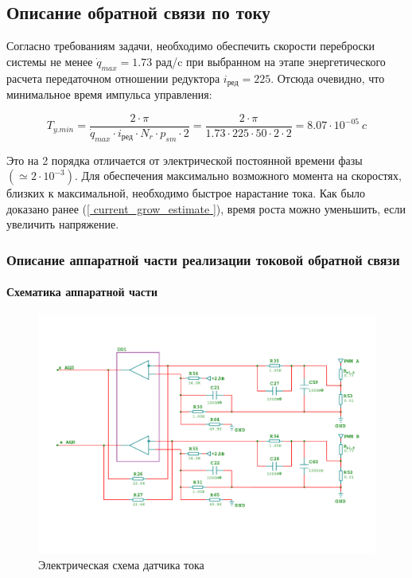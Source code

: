 \newpage
\subsection{ Описание обратной связи по току }
Согласно требованиям задачи, необходимо обеспечить скорости переброски системы не менее
$ \dot{q}_{max} = 1.73 $ рад/c при выбранном на этапе энергетического расчета передаточном
отношении редуктора $ i_\text{ред} = 225 $. Отсюда очевидно, что минимальное время импульса управления:

$$
    T_{y.min} = \frac{ 2 \cdot \pi }{ \dot{q}_{max} \cdot i_\text{ред} \cdot N_{r} \cdot p_{sm} \cdot 2 }
    = \frac{ 2 \cdot \pi }{ 1.73 \cdot 225 \cdot 50 \cdot 2 \cdot 2 }
    = 8.07 \cdot 10^{-05} ~c
$$

Это на 2 порядка отличается от электрической постоянной времени фазы $( \simeq2 \cdot 10^{-3} )$.
Для обеспечения максимально возможного момента на скоростях, близких к максимальной, необходимо
быстрое нарастание тока. Как было доказано ранее (\ref{ current_grow_estimate }), время роста можно
уменьшить, если увеличить напряжение.

\subsubsection{ Описание аппаратной части реализации токовой обратной связи }

\paragraph{ Схематика аппаратной части }

\begin{figure}[ht!]
    \centering
    \includegraphics[width=\textwidth, keepaspectratio, clip=true, trim=0mm 25mm 0mm 25mm]
                    {./src/pictures/current_measuring_sheme}
    \caption{Электрическая схема датчика тока}
    \label{pic_current_measuring_sheme}
\end{figure}

